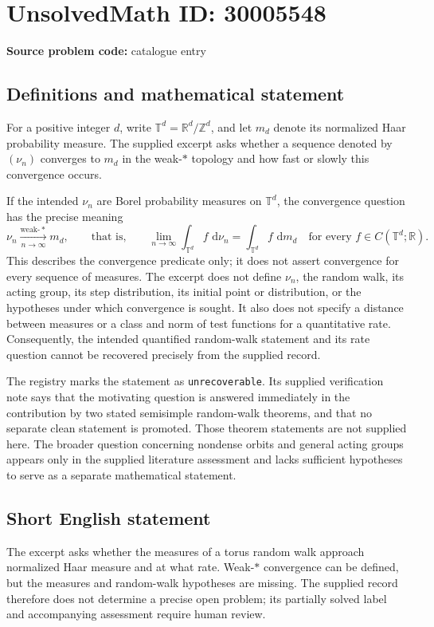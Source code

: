 \documentclass[11pt]{article}
\newcommand{\Z}{\mathbb{Z}}
\newcommand{\R}{\mathbb{R}}
\newcommand{\dd}{\,\mathrm{d}}
\begin{document}
\section*{UnsolvedMath ID: 30005548}
\textbf{Source problem code:} catalogue entry
\subsection{Definitions and mathematical statement}
For a positive integer \(d\), write \(\mathbb T^d=\R^d/\Z^d\), and let \(m_d\) denote its normalized Haar probability measure. The supplied excerpt asks whether a sequence denoted by \((\nu_n)\) converges to \(m_d\) in the weak-\(*\) topology and how fast or slowly this convergence occurs.

If the intended \(\nu_n\) are Borel probability measures on \(\mathbb T^d\), the convergence question has the precise meaning
\[
\nu_n\xrightarrow[n\to\infty]{\mathrm{weak}\text{-}*}m_d,
\qquad\text{that is,}\qquad
\lim_{n\to\infty}\int_{\mathbb T^d}f\,\dd\nu_n
=\int_{\mathbb T^d}f\,\dd m_d
\quad\text{for every }f\in C(\mathbb T^d;\R).
\]
This describes the convergence predicate only; it does not assert convergence for every sequence of measures. The excerpt does not define \(\nu_n\), the random walk, its acting group, its step distribution, its initial point or distribution, or the hypotheses under which convergence is sought. It also does not specify a distance between measures or a class and norm of test functions for a quantitative rate. Consequently, the intended quantified random-walk statement and its rate question cannot be recovered precisely from the supplied record.

The registry marks the statement as \texttt{unrecoverable}. Its supplied verification note says that the motivating question is answered immediately in the contribution by two stated semisimple random-walk theorems, and that no separate clean statement is promoted. Those theorem statements are not supplied here. The broader question concerning nondense orbits and general acting groups appears only in the supplied literature assessment and lacks sufficient hypotheses to serve as a separate mathematical statement.
\subsection{Short English statement}
The excerpt asks whether the measures of a torus random walk approach normalized Haar measure and at what rate. Weak-\(*\) convergence can be defined, but the measures and random-walk hypotheses are missing. The supplied record therefore does not determine a precise open problem; its partially solved label and accompanying assessment require human review.
\end{document}
